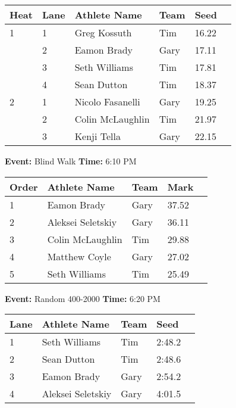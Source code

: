 \documentclass[10pt]{article}
\begin{document}
\vspace{1em}
\begin{tabular}{@{}llllll@{}}
\toprule
\textbf{{Heat}} &
\textbf{Lane} & \textbf{Athlete Name} & \textbf{Team} & \textbf{Seed} \\
\midrule
1 & 1 & Greg Kossuth & Tim & 16.22 &\\
 & 2 & Eamon Brady & Gary & 17.11 &\\
 & 3 & Seth Williams & Tim & 17.81 &\\
 & 4 & Sean Dutton & Tim & 18.37 &\\
2 & 1 & Nicolo Fasanelli & Gary & 19.25 &\\
 & 2 & Colin McLaughlin & Tim & 21.97 &\\
 & 3 & Kenji Tella & Gary & 22.15 &\\
\bottomrule
\end{tabular}
\vspace{2.5em}


\textbf{Event:} Blind Walk \quad \textbf{Time:} 6:10 PM 

\vspace{1em}
\begin{tabular}{@{}lllll@{}}
\toprule

\textbf{Order} & \textbf{Athlete Name} & \textbf{Team} & \textbf{Mark} \\
\midrule
1 & Eamon Brady & Gary & 37.52 &\\
2 & Aleksei Seletskiy & Gary & 36.11 &\\
3 & Colin McLaughlin & Tim & 29.88 &\\
4 & Matthew Coyle & Gary & 27.02 &\\
5 & Seth Williams & Tim & 25.49 &\\
\bottomrule
\end{tabular}
\vspace{2.5em}


\textbf{Event:} Random 400-2000 \quad \textbf{Time:} 6:20 PM 

\vspace{1em}
\begin{tabular}{@{}lllll@{}}
\toprule

\textbf{Lane} & \textbf{Athlete Name} & \textbf{Team} & \textbf{Seed} \\
\midrule
1 & Seth Williams & Tim & 2:48.2 &\\
2 & Sean Dutton & Tim & 2:48.6 &\\
3 & Eamon Brady & Gary & 2:54.2 &\\
4 & Aleksei Seletskiy & Gary & 4:01.5 &\\
\bottomrule
\end{tabular}
\vspace{2.5em}
\end{document}
